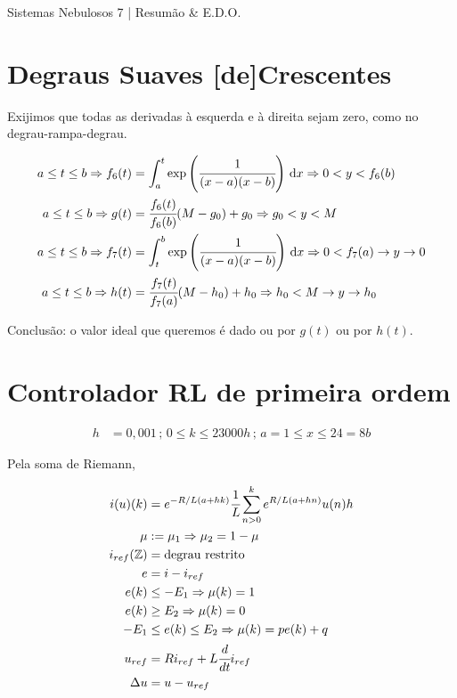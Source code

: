 \documentclass[11pt]{article}
\begin{document}
\Large

\begin{center}
Sistemas Nebulosos 7 | Resum\~ao \& E.D.O.
\end{center}

\normalsize

\vspace{3mm}

\section{Degraus Suaves [de]Crescentes}

Exijimos que todas as derivadas \`a esquerda e \`a direita sejam zero, como no degrau-rampa-degrau.

\begin{align}
  a \le t \le b \Rightarrow f_6(t) &= \int_a^t \exp\left(\cfrac{1}{(x - a) (x - b)}\right)\,\mathrm{d}x \Rightarrow 0 < y < f_6(b) \\
  a \le t \le b \Rightarrow g(t) &= \cfrac{f_6(t)}{f_6(b)} (M - g_0) + g_0 \Rightarrow g_0 < y < M \\
  a \le t \le b \Rightarrow f_7(t) &= \int_t^b \exp\left(\cfrac{1}{(x - a) (x - b)}\right)\,\mathrm{d}x \Rightarrow 0 < f_7(a) \to y \to 0 \\
  a \le t \le b \Rightarrow h(t) &= \cfrac{f_7(t)}{f_7(a)} (M - h_0) + h_0 \Rightarrow h_0 < M \to y \to h_0
\end{align}

Conclus\~ao: o valor ideal que queremos \'e dado ou por $g(t)$ ou por $h(t)$.

\section{Controlador RL de primeira ordem}

\begin{align}
  h &= 0,001\,;\,0 \le k \le 23000 h\,;\,a = 1 \le x \le 24 = 8b
\end{align}

Pela soma de Riemann,

\begin{align}
  i(u)(k) &= e^{-R/L (a + hk)}\cfrac{1}{L}\sum_{n > 0}^k e^{R/L (a + hn)} u(n) h \\  \mu &:= \mu_1 \Rightarrow \mu_2 = 1 - \mu \\
  i_{ref}(\mathbb{Z}) &= \text{degrau restrito} \\
  e &= i - i_{ref} \\
  e(k) &\le - E_1 \Rightarrow \mu(k) = 1 \\
  e(k) &\ge E_2 \Rightarrow \mu(k) = 0 \\
  - E_1 &\le e(k) \le E_2 \Rightarrow \mu(k) = p e(k) + q \\
  u_{ref} &= R i_{ref} + L \cfrac{d}{dt} i_{ref} \\
  \Delta u &= u - u_{ref}
\end{align}
\end{document}
